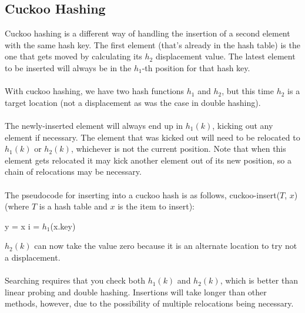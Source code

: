 \documentclass[]{article}
\theoremstyle{definition}
\newcommand{\lecture}[1]{\marginpar{{\footnotesize $\leftarrow$ \underline{#1}}}}
\begin{document}
		\subsection{Cuckoo Hashing}
			Cuckoo hashing is a different way of handling the insertion of a second element with the same hash key. The first element (that's already in the hash table) is the one that gets moved by calculating its $h_2$ displacement value. The latest element to be inserted will always be in the $h_1$-th position for that hash key.
			\\ \\
			\lecture{March 5, 2013}
			With cuckoo hashing, we have two hash functions $h_1$ and $h_2$, but this time $h_2$ is a target location (not a displacement as was the case in double hashing).
			\\ \\
			The newly-inserted element will always end up in $h_1(k)$, kicking out any element if necessary. The element that was kicked out will need to be relocated to $h_1(k)$ or $h_2(k)$, whichever is not the current position. Note that when this element gets relocated it may kick another element out of its new position, so a chain of relocations may be necessary.
			\\ \\
			The pseudocode for inserting into a cuckoo hash is as follows, cuckoo-insert($T$, $x$) (where $T$ is a hash table and $x$ is the item to insert): \\
			\begin{algorithm}[H]
				y = x\;
				i = $h_1$(x.key)\;
			\end{algorithm}

			$h_2(k)$ can now take the value zero because it is an alternate location to try \textendash{} not a displacement.
			\\ \\
			Searching requires that you check both $h_1(k)$ and $h_2(k)$, which is better than linear probing and double hashing. Insertions will take longer than other methods, however, due to the possibility of multiple relocations being necessary.
\end{document}
